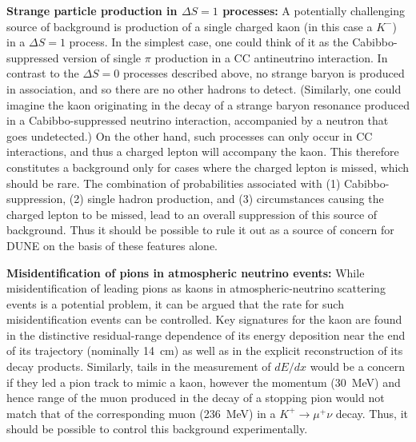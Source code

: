 \textbf{{\boldmath Strange particle production 
               in $\Delta S = 1$ processes:}}
A potentially challenging source of background is production 
of a single charged kaon (in this case a $K^-$) 
in a $\Delta S = 1$ process.  
In the simplest case, one could think of it as the Cabibbo-suppressed 
version of single $\pi$ production in a CC
antineutrino interaction.  In contrast to the $\Delta S = 0$ processes described above,
no strange baryon is
produced in association, and so there are no other hadrons to detect.  
(Similarly, one could imagine the kaon originating in 
the decay of a strange baryon resonance produced in a Cabibbo-suppressed 
neutrino interaction, accompanied by a neutron that goes undetected.)
On the other hand, such processes can only occur in CC 
interactions, and thus a charged lepton will accompany the 
kaon.  This therefore constitutes a background only for cases where 
the charged lepton is missed, which should be rare.  The combination 
of probabilities associated with (1) Cabibbo-suppression, (2) single 
hadron production, and (3) circumstances causing the charged lepton 
to be missed, lead to an overall suppression of this source of 
background.  Thus it should be possible to rule it out 
as a source of concern for DUNE on the basis of these features alone.


\textbf{\boldmath Misidentification of pions in 
               atmospheric neutrino events:}
While misidentification of 
leading pions as kaons in atmospheric-neutrino scattering events is a potential problem,
 it can be argued that the rate for such 
misidentification events can be controlled.  Key signatures 
for the kaon are found in the distinctive residual-range dependence 
of its energy deposition near the end of its 
trajectory (nominally \SI{14}{\cm}) as well as in the explicit reconstruction of its decay products. 
Similarly, tails in the measurement of $dE/dx$ would be a concern if they
led a pion track to mimic a kaon, however the momentum (\SI{30}{\MeV})
and hence range of the muon produced in the decay of a stopping pion 
would not match that of the corresponding muon (\SI{236}{\MeV}) 
in a $K^+\to \mu^+\nu$ decay.  Thus, it should be possible to 
control this background experimentally.

